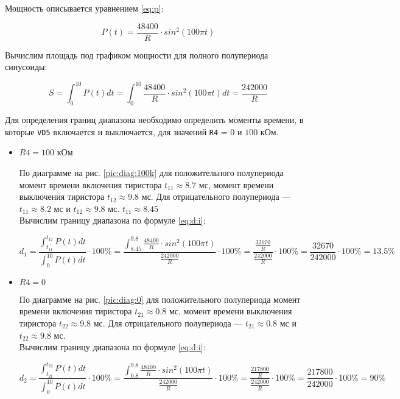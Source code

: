 Мощность описывается уравнением \ref{eq:p}:

\begin{equation}
\label{eq:p}
	P(t) = \frac{48400}{R} \cdot sin^2 \left(100 \pi t \right)
\end{equation}

Вычислим площадь под графиком мощности для полного полупериода синусоиды:

\begin{displaymath}
	S = \int_{0}^{10} P(t) dt = \int_{0}^{10} \frac{48400}{R} \cdot sin^2 \left(100 \pi t \right) dt = \frac{242000}{R}
\end{displaymath}

Для определения границ диапазона необходимо определить моменты времени, в которые \verb+VD5+ включается и выключается, для значений \verb+R4+ = $0$ и $100$ кОм.

\begin{itemize}

	\item $R4 = 100$ кОм
	
		По диаграмме на рис. \ref{pic:diag:100k} для положительного полупериода момент времени включения тиристора $t_{11} \approx 8.7$ мс, момент времени выключения тиристора $t_{12} \approx 9.8$ мс. Для отрицательного полупериода --- $t_{11} \approx 8.2$ мс и $t_{12} \approx 9.8$ мс. $\overline{{t_{11}}} \approx 8.45$\\
		Вычислим границу диапазона по формуле \ref{eq:d:i}:
		
		\begin{displaymath}
			d_1 = \frac{\int_{t_{11}}^{t_{12}} P(t) dt}{\int_{0}^{10} P(t) dt} \cdot 100\% = \frac{\int_{8.45}^{9.8} \frac{48400}{R} \cdot sin^2 \left(100 \pi t \right)}{\frac{242000}{R}} \cdot 100\% = \frac{\frac{32670}{R}}{\frac{242000}{R}} \cdot 100\% = \frac{32670}{242000} \cdot 100\% = 13.5 \%
		\end{displaymath}		
		
	\item $R4 = 0$
	
		По диаграмме на рис. \ref{pic:diag:0} для положительного полупериода момент времени включения тиристора $t_{21} \approx 0.8$ мс, момент времени выключения тиристора $t_{22} \approx 9.8$ мс. Для отрицательного полупериода --- $t_{21} \approx 0.8$ мс и $t_{22} \approx 9.8$ мс.\\
		Вычислим границу диапазона по формуле \ref{eq:d:i}:
		
		\begin{displaymath}
			d_2 = \frac{\int_{t_{21}}^{t_{22}} P(t) dt}{\int_{0}^{10} P(t) dt} \cdot 100\% = \frac{\int_{0.8}^{9.8} \frac{48400}{R} \cdot sin^2 \left(100 \pi t \right)}{\frac{242000}{R}} \cdot 100\% = \frac{\frac{217800}{R}}{\frac{242000}{R}} \cdot 100\% = \frac{217800}{242000} \cdot 100\% = 90 \%
		\end{displaymath}
		
\end{itemize}

